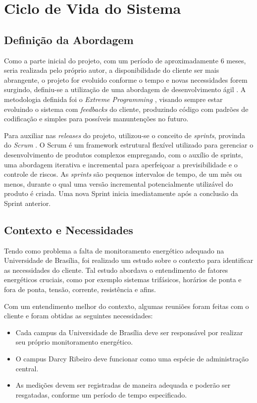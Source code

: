 \chapter{Ciclo de Vida do Sistema}
\section{Definição da Abordagem}
Como a parte inicial do projeto, com um período de aproximadamente 6 meses, seria realizada pelo próprio autor, a disponibilidade do cliente ser mais abrangente, o projeto for evoluido conforme o tempo e novas necessidades forem surgindo, definiu-se a utilização de uma abordagem de desenvolvimento ágil \cite{beck2001agile}. A metodologia definida foi o \textit{Extreme Programming} \cite{beck_2004}, visando sempre estar evoluindo o sistema com \textit{feedbacks} do cliente, produzindo código com padrões de codificação e simples para possíveis manuntenções no futuro.

Para auxiliar nas \textit{releases} do projeto, utilizou-se o conceito de \textit{sprints}, provinda do \textit{Scrum} \cite{scrum_guide}. O Scrum é um framework estrutural flexível utilizado para gerenciar o desenvolvimento de produtos complexos empregando, com o auxílio de sprints, uma abordagem iterativa e incremental para aperfeiçoar a previsibilidade e o controle de riscos. As \textit{sprints} são pequenos intervalos de tempo, de um mês ou menos, durante o qual uma versão incremental potencialmente utilizável do produto é criada. Uma nova Sprint inicia imediatamente após a conclusão da Sprint anterior.

\section{Contexto e Necessidades}
Tendo como problema a falta de monitoramento energético adequado na Universidade de Brasília, foi realizado um estudo sobre o contexto para identificar as necessidades do cliente. Tal estudo abordava o entendimento de fatores energéticos cruciais, como por exemplo sistemas trifásicos, horários de ponta e fora de ponta, tensão, corrente, resistência e afins.

Com um entendimento melhor do contexto, algumas reuniões foram feitas com o cliente e foram obtidas as seguintes necessidades:

\begin{itemize}
    \item Cada campus da Universidade de Brasília deve ser responsável por realizar seu próprio monitoramento energético.
    \item O campus Darcy Ribeiro deve funcionar como uma espécie de administração central.
    \item As medições devem ser registradas de maneira adequada e poderão ser resgatadas, conforme um período de tempo especificado.
\end{itemize}


